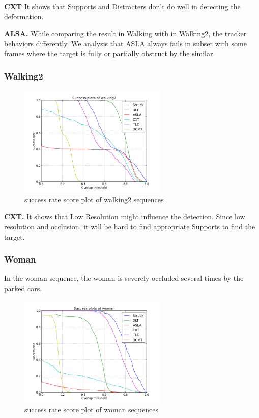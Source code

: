 \documentclass{acm_proc_article-sp}
\begin{document}
\textbf{CXT} It shows that Supports and Distracters don't do well in detecting the deformation.

\textbf{ALSA.} While comparing the result in Walking with in Walking2, the tracker behaviors differently. We analysis that ASLA always fails in subset with some frames where the target is fully or partially obstruct by the similar. 

\subsubsection{Walking2}

\begin{figure}[hbt]
    \includegraphics[width=200pt]{walking2}
    \caption{success rate score plot of walking2 sequences}
    \label{fig:walking2}
\end{figure}

\textbf{CXT.} It shows that Low Resolution might influence the detection. Since low resolution and occlusion, it will be hard to find appropriate Supports to find the target.

\subsubsection{Woman}

In the woman sequence, the woman is severely occluded several times by the parked cars.

\begin{figure}[hbt]
  \includegraphics[width=200pt]{woman}
  \caption{success rate score plot of woman sequences}
  \label{fig:woman}
\end{figure}
\end{document}
